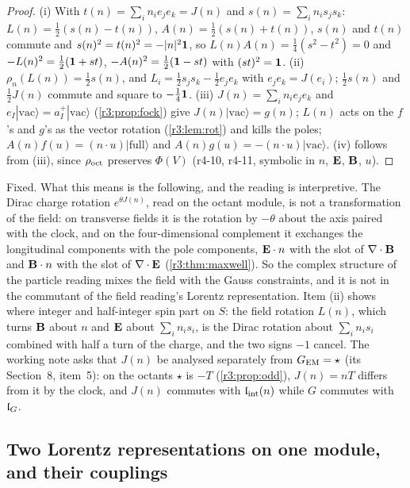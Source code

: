 \begin{proof}
(i) With $t(n)=\sum_in_ie_je_k=J(n)$ and $s(n)=\sum_in_is_js_k$: $L(n)=\tfrac12(s(n)-t(n))$, $A(n)=\tfrac12(s(n)+t(n))$, $s(n)$ and $t(n)$ commute and
$s(n)^2=t(n)^2=-|n|^2\mathbf 1$, so $L(n)A(n)=\tfrac14(s^2-t^2)=0$ and $-L(n)^2=\tfrac12(\mathbf 1+st)$, $-A(n)^2=\tfrac12(\mathbf 1-st)$ with $(st)^2=\mathbf 1$. (ii) $\rho_n(L(n))=\tfrac12s(n)$,
and $L_i=\tfrac12s_js_k-\tfrac12e_je_k$ with $e_je_k=J(e_i)$; $\tfrac12s(n)$ and $\tfrac12J(n)$ commute and square to $-\tfrac14\mathbf 1$. (iii) $J(n)=\sum_in_ie_je_k$ and $e_I|\mathrm{vac}\rangle=a^+_I|\mathrm{vac}\rangle$
(\cref{r3:prop:fock}) give $J(n)|\mathrm{vac}\rangle=g(n)$; $L(n)$ acts on the $f$'s and $g$'s as the vector rotation (\cref{r3:lem:rot}) and kills the poles; $A(n)f(u)=(n\cdot u)|\mathrm{full}\rangle$
and $A(n)g(u)=-(n\cdot u)|\mathrm{vac}\rangle$. (iv) follows from (iii), since $\rho_{\rm oct}$ preserves $\Phi(V)$ (r4-10, r4-11, symbolic in $n$, $\mathbf E$, $\mathbf B$, $u$).
\end{proof}

Fixed. What this means is the following, and the reading is interpretive. The Dirac charge rotation $e^{\theta J(n)}$, read on the octant module, is not
a transformation of the field: on transverse fields it is the rotation by $-\theta$ about the axis paired with the clock, and on the four-dimensional
complement it exchanges the longitudinal components with the pole components, $\mathbf E\cdot n$ with the slot of $\nabla\cdot\mathbf B$ and $\mathbf B\cdot n$ with the slot of
$\nabla\cdot\mathbf E$ (\cref{r3:thm:maxwell}). So the complex structure of the particle reading mixes the field with the Gauss constraints, and it is not in
the commutant of the field reading's Lorentz representation. Item (ii) shows where integer and half-integer spin part on $S$: the field rotation
$L(n)$, which turns $\mathbf B$ about $n$ and $\mathbf E$ about $\sum_in_is_i$, is the Dirac rotation about $\sum_in_is_i$ combined with half a turn of the charge,
and the two signs $-1$ cancel. The working note \cite{FMB} asks that
$J(n)$ be analysed separately from $G_{\rm EM}=\star$ (its Section~8, item~5): on the octants $\star$ is $-T$ (\cref{r3:prop:odd}), $J(n)=nT$ differs from it by
the clock, and $J(n)$ commutes with $\mathfrak l_{\rm int}(n)$ while $G$ commutes with $\mathfrak l_G$.

\subsection{Two Lorentz representations on one module, and their couplings}
\label{r4:sec:reps}

